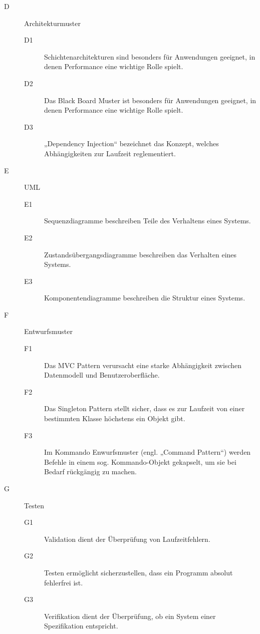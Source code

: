 \documentclass{lehramt-informatik}
\begin{document}
\begin{description}
%

\item[D] Architekturmuster

\begin{description}
\item[D1] Schichtenarchitekturen sind besonders für Anwendungen
geeignet, in denen Performance eine wichtige Rolle spielt.

\item[D2] Das Black Board Muster ist besonders für Anwendungen geeignet,
in denen Performance eine wichtige Rolle spielt.

\item[D3] „Dependency Injection“ bezeichnet das Konzept, welches
Abhängigkeiten zur Laufzeit reglementiert.
\end{description}

%

\item[E] UML

\begin{description}
\item[E1] Sequenzdiagramme beschreiben Teile des Verhaltens eines
Systems.

\item[E2] Zustandsübergangsdiagramme beschreiben das Verhalten eines
Systems.

\item[E3] Komponentendiagramme beschreiben die Struktur eines Systems.
\end{description}

%

\item[F] Entwurfsmuster

\begin{description}
\item[F1] Das MVC Pattern verursacht eine starke Abhängigkeit zwischen
Datenmodell und Benutzeroberfläche.

\item[F2] Das Singleton Pattern stellt sicher, dass es zur Laufzeit von
einer bestimmten Klasse höchstens ein Objekt gibt.

\item[F3] Im Kommando Enwurfsmuster (engl. „Command Pattern“) werden
Befehle in einem sog. Kommando-Objekt gekapselt, um sie bei Bedarf
rückgängig zu machen.
\end{description}

%

\item[G] Testen

\begin{description}
\item[G1] Validation dient der Überprüfung von Laufzeitfehlern.

\item[G2] Testen ermöglicht sicherzustellen, dass ein Programm absolut
fehlerfrei ist.

\item[G3] Verifikation dient der Überprüfung, ob ein System einer
Spezifikation entspricht.
\end{description}

\end{description}
\end{document}
